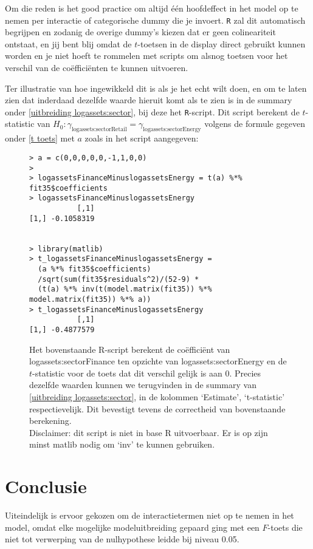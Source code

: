 \documentclass[a4paper]{report}
\begin{document}
  Om die reden is het good practice om altijd \' e\' en hoofdeffect in het model op te nemen per interactie of categorische dummy die je invoert. \verb!R! zal dit automatisch begrijpen en zodanig de overige  dummy's kiezen dat er geen colineariteit ontstaat, en jij bent blij omdat de $t$-toetsen in de display direct gebruikt kunnen worden en je niet hoeft te rommelen met scripts om alsnog toetsen voor het verschil van de co\"effici\"enten te kunnen uitvoeren. 
  
  Ter illustratie van hoe ingewikkeld dit is als je het echt wilt doen, en om te laten zien dat inderdaad dezelfde waarde hieruit komt als te zien is in de summary onder \ref{uitbreiding logassets:sector}, bij deze het \verb!R!-script. Dit script berekent de $t$-statistic van $H_0: \gamma_{\text{logassets:sectorRetail}}  = \gamma_{\text{logassets:sectorEnergy}}$ volgens de formule gegeven onder \ref{t toets} met $a$ zoals in het script aangegeven:
  
  \begin{figure}[H]
  \begin{verbatim}
> a = c(0,0,0,0,0,-1,1,0,0)
> 
> logassetsFinanceMinuslogassetsEnergy = t(a) %*% fit35$coefficients
> logassetsFinanceMinuslogassetsEnergy
           [,1]
[1,] -0.1058319
  
  
> library(matlib)
> t_logassetsFinanceMinuslogassetsEnergy = 
  (a %*% fit35$coefficients)
  /sqrt(sum(fit35$residuals^2)/(52-9) * 
  (t(a) %*% inv(t(model.matrix(fit35)) %*% model.matrix(fit35)) %*% a))
> t_logassetsFinanceMinuslogassetsEnergy
           [,1]
[1,] -0.4877579
  \end{verbatim}
  \caption{Het bovenstaande R-script berekent de co\"effici\"ent van logassets:sectorFinance ten opzichte van logassets:sectorEnergy en de $t$-statistic voor de toets dat dit verschil gelijk is aan 0. Precies dezelfde waarden kunnen we terugvinden in de summary van \ref{uitbreiding logassets:sector}, in de kolommen `Estimate', `t-statistic' respectievelijk. Dit bevestigt tevens de correctheid van bovenstaande berekening. \\
  Disclaimer: dit script is niet in base R uitvoerbaar. Er is op zijn minst matlib nodig om `inv' te kunnen gebruiken.}
  \end{figure}

\section{Conclusie}

  Uiteindelijk is ervoor gekozen om de interactietermen niet op te nemen in het model, omdat elke mogelijke modeluitbreiding gepaard ging met een $F$-toets die niet tot verwerping van de nulhypothese leidde bij niveau 0.05.
  
\end{document}
